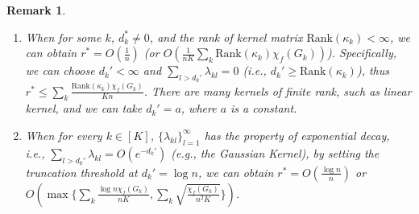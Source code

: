 \documentclass{article}
\def\vx{{\mathbf{x}}}
\def\leqone{\overset{\text{\ding{172}}}{\leq}}
\def\leqtwo{\overset{\text{\ding{173}}}{\leq}}
\newtheorem*{remark}{Remark}
\begin{document}
\begin{remark}
\begin{enumerate}[(1)]
    \item When for some $k$,  $d_k^* \neq 0$, and the rank of kernel matrix $\mathrm{Rank}(\kappa_k) < \infty$, we can obtain $r^* = O(\frac{1}{n})$ (or $O\left(  \frac{1}{n K} \sum_k \mathrm{Rank}(\kappa_k) \chi_f(G_k)
 \right)$). Specifically, 
    we can choose $d_k' < \infty$ and $\sum_{l >d_k'} \lambda_{kl} = 0$ (i.e., $d_k' \geq \mathrm{Rank}(\kappa_k)$), thus $r^* \leq \sum_k \frac{\mathrm{Rank}(\kappa_k) \chi_f(G_k)}{K n}$.
    There are many kernels of finite rank, such as linear kernel, and we can take $d_k' = a$, where $a$ is a constant.
    \item When for every $k \in [K]$, ${\{\lambda_{kl}\}}_{l = 1}^{\infty} $ has the property of exponential decay, i.e., $\sum_{l >d_k'} \lambda_{kl} = O(e^{-d_k'})$ (e.g., the Gaussian Kernel), by setting the truncation threshold at $d_k' = \log n$, we can obtain $r^* = O(\frac{\log n}{n})$ or $O\left( \max\{\sum_k \frac{\log n \chi_f(G_k)}{n K} , \sum_k \sqrt{\frac{\chi_f(G_k)}{n^2 K}}\}\right)$.

\end{enumerate}
\end{remark}
\end{document}
